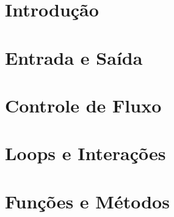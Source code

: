 \documentclass[t, 				             
			   final,
			   12pt, 				         
			   xcolor={usenames,dvipsnames}, 
			   table]{beamer}
\begin{document}
	
	
	  
	\section{Introdução}	
	
	\section{Entrada e Saída}
	
	\section{Controle de Fluxo}
	
	\section{Loops e Interações}	
	
	\section{Funções e Métodos}
	
	
\end{document}
